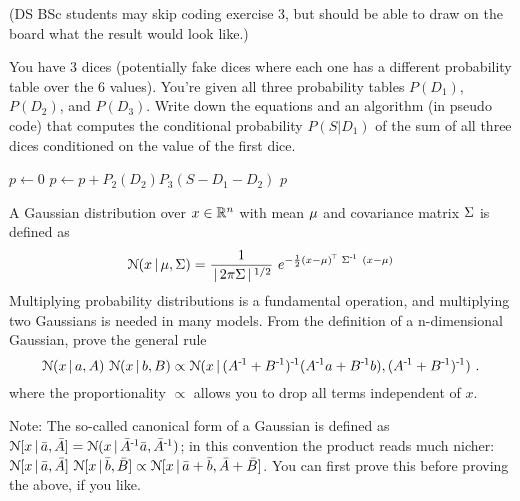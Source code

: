 


\renewcommand{\course}{Machine Learning}
\renewcommand{\exnum}{11}

\exercises
{}
\exercisestitle

(DS BSc students may skip coding exercise 3, but should be able to draw on the board what the result would look like.)



You have 3 dices (potentially fake dices where each one has a
different probability table over the 6 values). You're given all three
probability tables $P(D_1)$, $P(D_2)$, and $P(D_3)$. Write down the
equations and an algorithm (in pseudo code) that computes the
conditional probability $P(S|D_1)$ of the sum of all three dices
conditioned on the value of the first dice.

\begin{algorithm}
	\begin{algorithmic}
		\State $p\gets 0$
		\State $p\gets p + P_2(D_2)P_3(S - D_1 - D_2)$
		\EndFor
		\State \Return $p$
		\EndFunction
	\end{algorithmic}
\end{algorithm}



A Gaussian distribution over $x\in\RRR^n$ with mean $\m$ and covariance matrix
$\S$ is defined as
$$\NN(x \| \m,\S) = \frac{1}{\|2\pi \S\|^{1/2}}~ e^{-\half
	(x-\m)^\T~ \S^\1~ (x-\m)}$$
Multiplying probability distributions is a
fundamental operation, and multiplying two Gaussians is needed in many
models. From the definition of a n-dimensional Gaussian, prove the general rule
$$
\NN(x \| a,A)~ \NN(x \| b,B) 
\propto \NN(x \| (A^\1+B^\1)^\1 (A^\1 a + B^\1 b) ,(A^\1+B^\1)^\1) ~.
$$
where the proportionality $\propto$ allows you to drop all terms independent of $x$.

Note: The so-called canonical form of a Gaussian is defined as
$\NN[x \| \bar a,\bar A] = \NN(x \| \bar A^\1 \bar a, \bar A^\1)$; in
this convention the product reads much nicher: $\NN[x \| \bar a,\bar
A]~ \NN[x \| \bar b,\bar B] \propto \NN[x \| \bar a+\bar b,\bar A+\bar
B]$. You can first prove this before proving the above, if you like.

